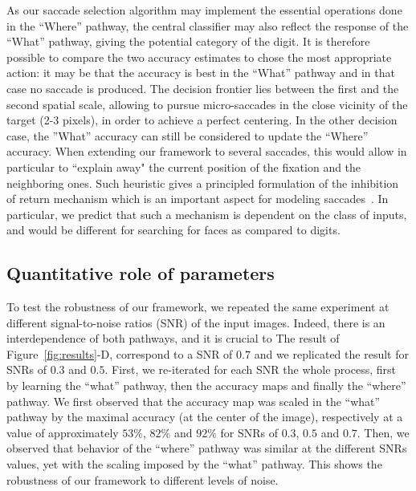 As our saccade selection algorithm may implement the essential operations done in the ``Where'' pathway, the central classifier may also reflect the response of the ``What'' pathway, giving the potential category of the digit. It is therefore possible to compare the two accuracy estimates to chose the most appropriate action: it may be that the accuracy is best in the ``What'' pathway and in that case no saccade is produced. The decision frontier lies between the first and the second spatial scale, allowing to pursue micro-saccades in the close vicinity of the target (2-3 pixels), in order to achieve a perfect centering.  In the other decision case, the ''What'' accuracy can still be considered to update the ``Where'' accuracy. When extending our framework to several saccades, this would allow in particular to ``explain away" the current position of the fixation and the neighboring ones. Such heuristic gives a principled formulation of the inhibition of return mechanism which is an important aspect for modeling saccades~\citep{Itti01}. In particular, we predict that such a mechanism is dependent on the class of inputs, and would be different for searching for faces as compared to digits. 

\subsection{Quantitative role of parameters}
To test the robustness of our framework, we repeated the same experiment at different signal-to-noise ratios (SNR) of the input images. Indeed, there is an interdependence of both pathways, and it is crucial to 
The result of Figure~\ref{fig:results}-D, correspond to a SNR of $0.7$ and we replicated the result for SNRs of $0.3$ and $0.5$. First, we re-iterated for each SNR the whole process, first by learning the ``what'' pathway, then the accuracy maps and finally the ``where'' pathway. We first observed that the accuracy map was scaled in the ``what'' pathway by the maximal accuracy (at the center of the image), respectively at a value of approximately $53\%$, $82\%$ and $92\%$ for SNRs of $0.3$, $0.5$ and $0.7$. Then, we observed that behavior of the ``where'' pathway was similar at the different SNRs values, yet with the scaling imposed by the ``what'' pathway. This shows the robustness of our framework to different levels of noise.

